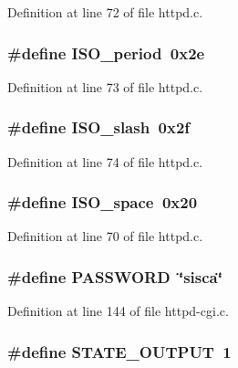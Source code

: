 Definition at line 72 of file httpd.c.

\hypertarget{group__httpd_gaf7dd2757d1e766f65b01ba7c91c660a0}{
\subsubsection[{ISO\_\-period}]{\setlength{\rightskip}{0pt plus 5cm}\#define ISO\_\-period~0x2e}}
\label{group__httpd_gaf7dd2757d1e766f65b01ba7c91c660a0}


Definition at line 73 of file httpd.c.

\hypertarget{group__httpd_ga820fb27c50e7bb4ac6d9eae1b06630a5}{
\subsubsection[{ISO\_\-slash}]{\setlength{\rightskip}{0pt plus 5cm}\#define ISO\_\-slash~0x2f}}
\label{group__httpd_ga820fb27c50e7bb4ac6d9eae1b06630a5}


Definition at line 74 of file httpd.c.

\hypertarget{group__httpd_ga71e1b022f7b7fa3a154f19372b239935}{
\subsubsection[{ISO\_\-space}]{\setlength{\rightskip}{0pt plus 5cm}\#define ISO\_\-space~0x20}}
\label{group__httpd_ga71e1b022f7b7fa3a154f19372b239935}


Definition at line 70 of file httpd.c.

\hypertarget{group__httpd_ga9e8538fad4eee548302ad9f60e6d47ca}{
\subsubsection[{PASSWORD}]{\setlength{\rightskip}{0pt plus 5cm}\#define PASSWORD~\char`\"{}sisca\char`\"{}}}
\label{group__httpd_ga9e8538fad4eee548302ad9f60e6d47ca}


Definition at line 144 of file httpd-\/cgi.c.

\hypertarget{group__httpd_ga8a645f8831837320c4e0c704e871abcf}{
\subsubsection[{STATE\_\-OUTPUT}]{\setlength{\rightskip}{0pt plus 5cm}\#define STATE\_\-OUTPUT~1}}
\label{group__httpd_ga8a645f8831837320c4e0c704e871abcf}


